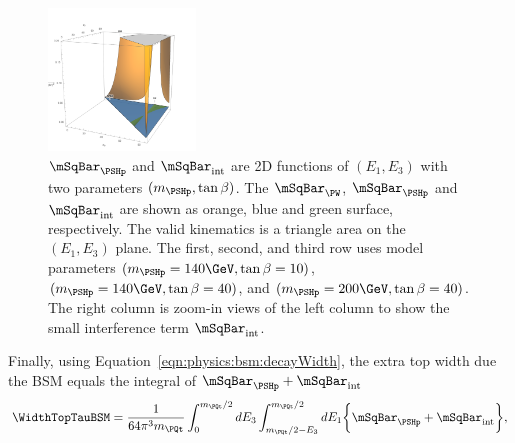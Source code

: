\begin{figure}[ht]
    \includegraphics[width=0.35\textwidth]{chapters/Physics/sectionBSM/figures/zoom_2HDM_200_40.png}
    \caption{  $\mSqBar _{\PSHp}$ and $ \mSqBar _{\mathrm{int}}$ are 2D functions of $(E_1, E_3)$ with two parameters $(m_{\PSHp}, \tan\beta)$. The $\mSqBar _{\PW}$, $\mSqBar _{\PSHp} $ and $\mSqBar _{\mathrm{int}}$ are shown as orange, blue and green surface, respectively. The valid kinematics is a triangle area on the $(E_1, E_3)$  plane. The first, second, and third row uses model parameters $(m_{\PSHp} = 140 \GeV, \tan\beta=10)$, $(m_{\PSHp} = 140 \GeV, \tan\beta=40)$, and $(m_{\PSHp} = 200 \GeV, \tan\beta=40)$. The right column is zoom-in views of the left column to show the small interference term $ \mSqBar _{\mathrm{int}}$.}
    \label{fig:physics:bsm:chargedHiggs:m2}
\end{figure}




Finally, using Equation~\ref{eqn:physics:bsm:decayWidth}, the extra top width due the BSM \PSHp equals the integral of  $\mSqBar _{\PSHp} +  \mSqBar _{\mathrm{int}}$
\begin{equation}
	\WidthTopTauBSM = \frac{1}{64 \pi^3 m_\PQt} \int_{0}^{m_\PQt/2} dE_3 \int_{m_\PQt/2-E_3}^{m_\PQt/2} dE_1  \bigg\{ \mSqBar _{\PSHp} +  \mSqBar_{\mathrm{int}}  \bigg \},
\end{equation}

